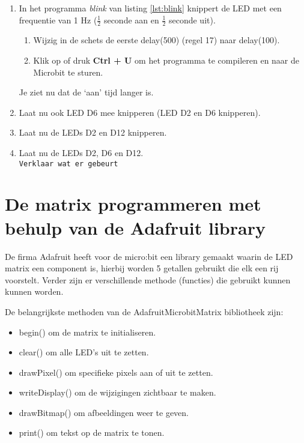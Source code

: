 \begin{enumerate}
	
\item In het programma \textit{blink} van listing \ref{lst:blink} knippert de LED met een frequentie van 1 Hz ($\frac{1}{2}$ seconde aan en $\frac{1}{2}$ seconde uit).\\
\begin{enumerate}
	\item Wijzig in de schets de eerste \textcolor{BurntOrange}{delay}(500) (regel 17) naar \textcolor{BurntOrange}{delay}(100).
	\item   Klik op  of druk \colorbox{mygray}{\textbf{Ctrl + U}} om het programma te compileren en naar de Microbit te sturen.
\end{enumerate}

Je ziet nu dat de ‘aan’ tijd langer is.
\item Laat nu ook LED D6 mee knipperen (LED D2 en D6 knipperen).

\item Laat nu de LEDs D2 en D12 knipperen.

\item Laat nu de LEDs D2, D6 en D12.\\ 
\texttt{Verklaar wat er gebeurt}



\end{enumerate}

\section{De matrix programmeren met behulp van de Adafruit library}\label{sec:matrix}

De firma Adafruit heeft voor de micro:bit een library gemaakt waarin de LED matrix een component is, hierbij worden 5 getallen gebruikt die elk een rij voorstelt. Verder zijn er verschillende methode (functies) die gebruikt kunnen kunnen worden.

De belangrijkste methoden van de Adafruit\textunderscore Microbit\textunderscore Matrix bibliotheek zijn:
\begin{itemize}
	\item begin() om de matrix te initialiseren.
	\item clear() om alle LED's uit te zetten.
	\item drawPixel() om specifieke pixels aan of uit te zetten.
	\item writeDisplay() om de wijzigingen zichtbaar te maken.
	\item drawBitmap() om afbeeldingen weer te geven.
	\item print() om tekst op de matrix te tonen.
\end{itemize}

